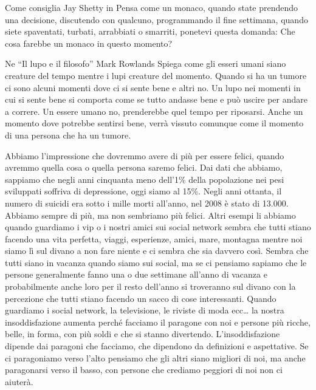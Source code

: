 \documentclass[12pt]{book} %
\begin{document}
\begin{mdframed}[linewidth=1pt]
Come consiglia Jay Shetty in Pensa come un monaco, quando state prendendo una
decisione, discutendo con qualcuno, programmando il fine settimana, quando siete spaventati, turbati, arrabbiati o
smarriti, ponetevi questa domanda: Che cosa farebbe un monaco in questo momento? 

Ne “Il lupo e il filosofo” Mark
Rowlands Spiega come gli esseri umani siano creature del tempo mentre i lupi creature del momento. Quando si ha un
tumore ci sono alcuni momenti dove ci si sente bene e altri no. Un lupo nei momenti in cui si sente bene si comporta
come se tutto andasse bene e può uscire per andare a correre. Un essere umano no, prenderebbe quel tempo per riposarsi.
Anche un momento dove potrebbe sentirsi bene, verrà vissuto comunque come il momento di una persona che ha un tumore.
\end{mdframed}

Abbiamo l'impressione che dovremmo avere di più per essere felici, quando avremmo quella cosa o
quella persona saremo felici. Dai dati che abbiamo, sappiamo che negli anni cinquanta meno
dell'1\% della popolazione nei pesi sviluppati soffriva di depressione, oggi siamo al 15\%. Negli
anni ottanta, il numero di suicidi era sotto i mille morti all'anno, nel 2008 è stato di 13.000.
Abbiamo sempre di più, ma non sembriamo più felici. Altri esempi li abbiamo quando guardiamo i vip o i nostri amici sui
social network sembra che tutti stiano facendo una vita perfetta, viaggi, esperienze, amici, mare, montagna mentre noi
siamo lì sul divano a non fare niente e ci sembra che sia davvero così. Sembra che tutti siano in vacanza quando siamo sui social, ma se
ci pensiamo sapiamo che le persone generalmente fanno una o due settimane all'anno di vacanza e
probabilmente anche loro per il resto dell'anno si troveranno sul divano con la percezione che
tutti stiano facendo un sacco di cose interessanti. Quando guardiamo i social network, la
televisione, le riviste di moda ecc… la nostra insoddisfazione aumenta perché facciamo il paragone con noi e persone
più ricche, belle, in forma, con più soldi e che si stanno divertendo. L'insoddisfazione dipende dai paragoni che
facciamo, che dipendono da definizioni e aspettative. Se ci paragoniamo verso l'alto pensiamo che gli altri siano
migliori di noi, ma anche paragonarsi verso il basso, con persone che crediamo peggiori di noi non ci aiuterà.
\end{document}
